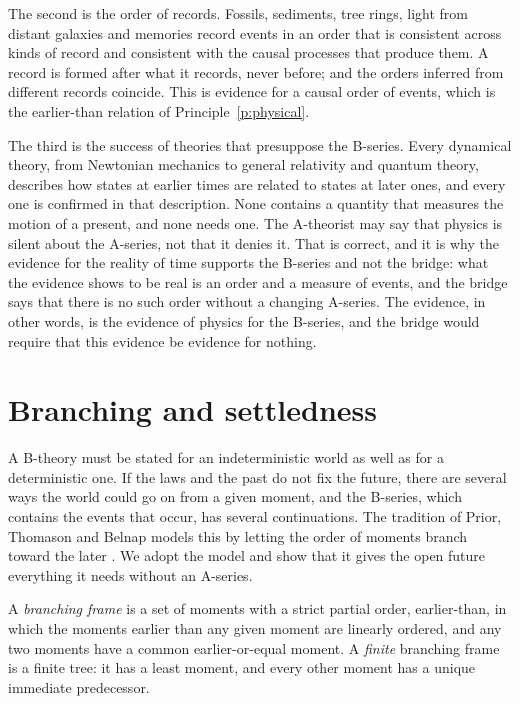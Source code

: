 \documentclass{situationist-preprint}
\begin{document}
The second is the order of records. Fossils, sediments, tree rings, light from distant galaxies and memories record events in an order that is consistent across kinds of record and consistent with the causal processes that produce them. A record is formed after what it records, never before; and the orders inferred from different records coincide. This is evidence for a causal order of events, which is the earlier-than relation of Principle~\ref{p:physical}.

The third is the success of theories that presuppose the B-series. Every dynamical theory, from Newtonian mechanics to general relativity and quantum theory, describes how states at earlier times are related to states at later ones, and every one is confirmed in that description. None contains a quantity that measures the motion of a present, and none needs one. The A-theorist may say that physics is silent about the A-series, not that it denies it. That is correct, and it is why the evidence for the reality of time supports the B-series and not the bridge: what the evidence shows to be real is an order and a measure of events, and the bridge says that there is no such order without a changing A-series. The evidence, in other words, is the evidence of physics for the B-series, and the bridge would require that this evidence be evidence for nothing.


\section{Branching and settledness}\label{s:branching}

A B-theory must be stated for an indeterministic world as well as for a deterministic one. If the laws and the past do not fix the future, there are several ways the world could go on from a given moment, and the B-series, which contains the events that occur, has several continuations. The tradition of Prior, Thomason and Belnap models this by letting the order of moments branch toward the later \citep{Prior1967,Thomason1970,Belnap2001}. We adopt the model and show that it gives the open future everything it needs without an A-series.

\begin{definition}\label{d:frame}
A \emph{branching frame} is a set of moments with a strict partial order, earlier-than, in which the moments earlier than any given moment are linearly ordered, and any two moments have a common earlier-or-equal moment. A \emph{finite} branching frame is a finite tree: it has a least moment, and every other moment has a unique immediate predecessor.
\end{definition}
\end{document}
